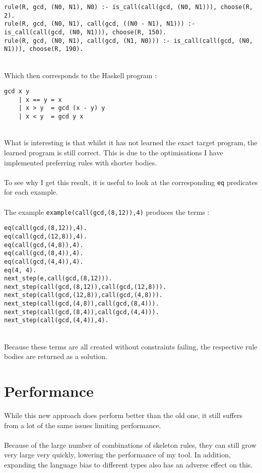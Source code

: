 \begin{lstlisting}
rule(R, gcd, (N0, N1), N0) :- is_call(call(gcd, (N0, N1))), choose(R, 2). 
rule(R, gcd, (N0, N1), call(gcd, ((N0 - N1), N1))) :- is_call(call(gcd, (N0, N1))), choose(R, 150).
rule(R, gcd, (N0, N1), call(gcd, (N1, N0))) :- is_call(call(gcd, (N0, N1))), choose(R, 190).
\end{lstlisting}
\mbox{} \\
Which then corresponds to the Haskell program :

\begin{lstlisting}
gcd x y
	| x == y = x
	| x > y	 = gcd (x - y) y
	| x < y	 = gcd y x
\end{lstlisting}
\mbox{} \\
What is interesting is that whilst it has not learned the exact target program, the learned program is still correct. This is due to the optimisations I have implemented preferring rules with shorter bodies.\\ \\
To see why I get this result, it is useful to look at the corresponding \lstinline{eq} predicates for each example. \\ \\%
The example \lstinline{example(call(gcd,(8,12)),4)} produces the terms :\\ %
\begin{multicols}{2}
\begin{lstlisting}
eq(call(gcd,(8,12)),4). 
eq(call(gcd,(12,8)),4).
eq(call(gcd,(4,8)),4).
eq(call(gcd,(8,4)),4).
eq(call(gcd,(4,4)),4).
eq(4, 4).
next_step(e,call(gcd,(8,12))).
next_step(call(gcd,(8,12)),call(gcd,(12,8))).
next_step(call(gcd,(12,8)),call(gcd,(4,8))).
next_step(call(gcd,(4,8)),call(gcd,(8,4))).
next_step(call(gcd,(8,4)),call(gcd,(4,4))).
next_step(call(gcd,(4,4)),4).
\end{lstlisting}
\end{multicols}
\mbox{}\\
Because these terms are all created without constraints failing, the respective rule bodies are returned as a solution.

\section{Performance}
While this new approach does perform better than the old one, it still suffers from a lot of the same issues limiting performance. \\ \\
Because of the large number of combinations of skeleton rules, they can still grow very large very quickly, lowering the performance of my tool. In addition, expanding the language bias to different types also has an adverse effect on this.

